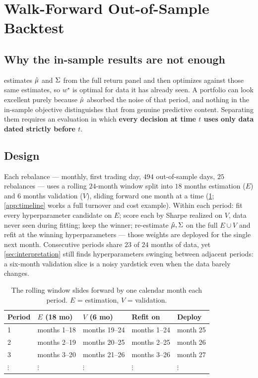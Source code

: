 \section{Walk-Forward Out-of-Sample Backtest}\label{sec:backtest}

\subsection{Why the in-sample results are not enough}

 estimates $\hat{\mu}$ and $\Sigma$ from the full return panel and then optimizes
against those same estimates, so $w^\star$ is optimal for data it has already seen. A portfolio
can look excellent purely because $\hat{\mu}$ absorbed the noise of that period, and nothing in the
in-sample objective distinguishes that from genuine predictive content. Separating them requires
an evaluation in which \textbf{every decision at time $t$ uses only data dated strictly before
$t$}.

\subsection{Design}

Each rebalance --- monthly, first trading day, $494$ out-of-sample days, $25$ rebalances ---
uses a rolling $24$-month window split into $18$ months estimation ($E$) and $6$ months
validation ($V$), sliding forward one month at a time (\cref{tab:timeline}; \cref{app:timeline}
works a full turnover and cost example). Within each period: fit every hyperparameter candidate
on $E$; score each by Sharpe realized on $V$, data never seen during fitting; keep the winner;
re-estimate $\hat{\mu},\Sigma$ on the full $E\cup V$ and refit at the winning hyperparameters --- those
weights are deployed for the single next month. Consecutive periods share $23$ of $24$ months of
data, yet \cref{sec:interpretation} still finds hyperparameters swinging between adjacent
periods: a six-month validation slice is a noisy yardstick even when the data barely changes.

\begin{table}[htbp]
\centering
\caption{The rolling window slides forward by one calendar month each period. $E$ = estimation,
$V$ = validation.}
\label{tab:timeline}
\small
\begin{tabular}{@{}lllll@{}}
\toprule
Period & $E$ (18 mo) & $V$ (6 mo) & Refit on & Deploy \\
\midrule
1 & months 1--18 & months 19--24 & months 1--24 & month 25 \\
2 & months 2--19 & months 20--25 & months 2--25 & month 26 \\
3 & months 3--20 & months 21--26 & months 3--26 & month 27 \\
$\vdots$ & $\vdots$ & $\vdots$ & $\vdots$ & $\vdots$ \\
\bottomrule
\end{tabular}
\end{table}

